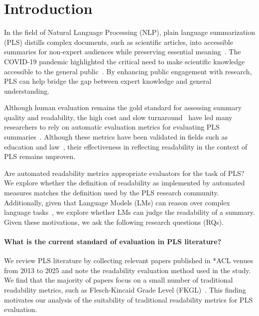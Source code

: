 \section{Introduction}

In the field of Natural Language Processing (NLP), plain language summarization (PLS) distills complex documents, such as scientific articles, into accessible summaries for non-expert audiences while preserving essential meaning~\cite{chandrasekaran2020overview}. The COVID-19 pandemic highlighted the critical need to make scientific knowledge accessible to the general public~\cite{wang-etal-2020-cord}. By enhancing public engagement with research, PLS can help bridge the gap between expert knowledge and general understanding.


Although human evaluation remains the gold standard for assessing summary quality and readability, the high cost and slow turnaround~\cite{Liu2022RevisitingTG} have led many researchers to rely on automatic evaluation metrics for evaluating PLS summaries~\cite{goldsack2022making,Guo2020AutomatedLL}. Although these metrics have been validated in fields such as education and law~\cite{gray1935makes, Han2024TheUO}, their effectiveness in reflecting readability in the context of PLS remains unproven.


Are automated readability metrics appropriate evaluators for the task of PLS? We explore whether the definition of readability as implemented by automated measures matches the definition used by the PLS research community. Additionally, given that Language Models (LMs) can reason over complex language tasks~\cite{Brown2020LanguageMA, Wei2022ChainOT, Yang2024DoLL}, we explore whether LMs can judge the readability of a summary. Given these motivations, we ask the following research questions (RQs).

\paragraph{{\rqone\label{rq1}}What is the current standard of evaluation in PLS literature?} 
We review PLS literature by collecting relevant papers published in *ACL venues from 2013 to 2025 and note the readability evaluation method used in the study. We find that the majority of papers focus on a small number of traditional readability metrics, such as Flesch-Kincaid Grade Level (FKGL)~\cite{flesch1952simplification}.
This finding motivates our analysis of the suitability of traditional readability metrics for PLS evaluation.


